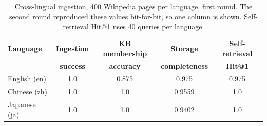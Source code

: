 \begin{table}[t]
\centering
\caption{Cross-lingual ingestion, 400 Wikipedia pages per language,
first round. The second round reproduced these values bit-for-bit, so
one column is shown. Self-retrieval Hit@1 uses 40 queries per
language.}
\label{tab:acq-crosslang}
\small
\setlength{\tabcolsep}{3pt}
\begin{tabular}{@{}lcccc@{}}
\toprule
\textbf{Language} & \textbf{Ingestion} & \textbf{KB membership} & \textbf{Storage} & \textbf{Self-retrieval} \\
 & \textbf{success} & \textbf{accuracy} & \textbf{completeness} & \textbf{Hit@1} \\
\midrule
English (en) & 1.0 & 0.875  & 0.975   & 0.975 \\
Chinese (zh) & 1.0 & 1.0    & 0.9559  & 1.0 \\
Japanese (ja) & 1.0 & 1.0    & 0.9402  & 1.0 \\
\bottomrule
\end{tabular}
\end{table}

